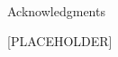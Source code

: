 
\renewcommand{\baselinestretch}{2}
\small\normalsize
\hbox{\ }
 
\vspace{-.65in}

\begin{center}
\large{Acknowledgments} 
\end{center} 

\vspace{1ex}

[PLACEHOLDER]



